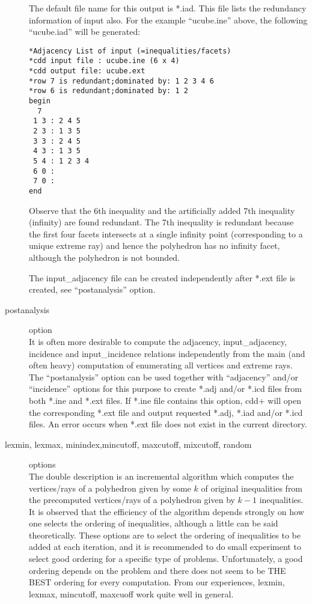\documentclass[11pt]{article}
\begin{document}
\begin{description}
The default file name for this output is *.iad.  This file
lists the redundancy information of input also.  For the example
``ucube.ine'' above, the following ``ucube.iad'' will
be generated:
\begin{verbatim}
*Adjacency List of input (=inequalities/facets)
*cdd input file : ucube.ine (6 x 4)
*cdd output file: ucube.ext
*row 7 is redundant;dominated by: 1 2 3 4 6
*row 6 is redundant;dominated by: 1 2
begin
  7
 1 3 : 2 4 5
 2 3 : 1 3 5
 3 3 : 2 4 5
 4 3 : 1 3 5
 5 4 : 1 2 3 4
 6 0 :
 7 0 :
end
\end{verbatim}
Observe that the 6th inequality and the 
artificially added 7th inequality (infinity)
are found redundant.  The 7th inequality is redundant
because the first four facets intersects at
a single infinity point (corresponding to a unique extreme ray)
and hence the polyhedron has no infinity facet,
although the polyhedron is not bounded.

The input\_adjacency file  can be created independently
after *.ext file is created, see ``postanalysis'' option.

\item[postanalysis] option\\
It is often more desirable to compute the adjacency, 
input\_adjacency, incidence and input\_incidence relations
independently from the main (and often heavy) computation of enumerating all vertices
and extreme rays.  The ``postanalysis'' option can be used together
with ``adjacency'' and/or ``incidence'' options for this purpose  
to create *.adj and/or *.icd files from both *.ine and *.ext files.
If *.ine file contains this option, cdd+ will open the
corresponding *.ext file and output requested *.adj, *.iad and/or *.icd files.
An error occurs when *.ext file does not exist in the current
directory.

\item[lexmin, lexmax, minindex,mincutoff, maxcutoff, mixcutoff, random] options\\
The double description is an incremental algorithm which
computes the vertices/rays of a polyhedron given by some $k$ of
original inequalities from the precomputed vertices/rays of a
polyhedron given by $k-1$ inequalities.  It is observed that
the efficiency of the algorithm depends strongly on how
one selects the ordering of inequalities, although a little
can be said theoretically.
These options are to select the ordering of inequalities to be
added at each iteration, and it is recommended to do small
experiment to select good ordering for a specific type of problems.
Unfortunately, a good ordering depends on the problem and there does not seem 
to be THE BEST ordering for every computation.  From our experiences,
lexmin, lexmax, mincutoff, maxcuoff work quite well in general.


\end{description}
\end{document}
